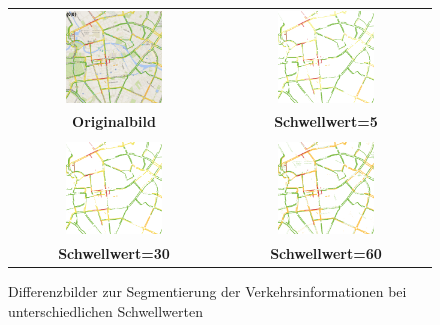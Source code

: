 \begin{figure}
\begin{tabular}{@{}cc@{}}
\includegraphics[width = 0.48\textwidth]{images/traffic_berlin.png} &
\includegraphics[width = 0.48\textwidth]{images/traffic_berlin_t5.png} \\ 
\textbf{Originalbild}  & \textbf{Schwellwert=5}   \\\\
\includegraphics[width = 0.48\textwidth]{images/traffic_berlin_t30.png} & 
\includegraphics[width = 0.48\textwidth]{images/traffic_berlin_t60.png} \\
\textbf{Schwellwert=30} & \textbf{Schwellwert=60}\\
\end{tabular}
\caption{Differenzbilder zur Segmentierung der Verkehrsinformationen bei unterschiedlichen Schwellwerten}
\label{fig:uebersicht_verkehrszustaende}
\end{figure}
